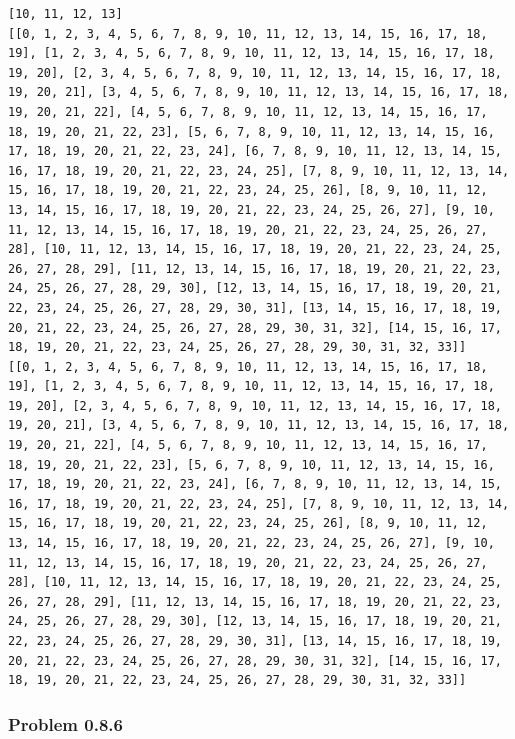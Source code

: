 \documentclass[
  letterpaper,
  DIV=11,
  numbers=noendperiod]{scrartcl}
\begin{document}
\begin{verbatim}
[10, 11, 12, 13]
[[0, 1, 2, 3, 4, 5, 6, 7, 8, 9, 10, 11, 12, 13, 14, 15, 16, 17, 18, 19], [1, 2, 3, 4, 5, 6, 7, 8, 9, 10, 11, 12, 13, 14, 15, 16, 17, 18, 19, 20], [2, 3, 4, 5, 6, 7, 8, 9, 10, 11, 12, 13, 14, 15, 16, 17, 18, 19, 20, 21], [3, 4, 5, 6, 7, 8, 9, 10, 11, 12, 13, 14, 15, 16, 17, 18, 19, 20, 21, 22], [4, 5, 6, 7, 8, 9, 10, 11, 12, 13, 14, 15, 16, 17, 18, 19, 20, 21, 22, 23], [5, 6, 7, 8, 9, 10, 11, 12, 13, 14, 15, 16, 17, 18, 19, 20, 21, 22, 23, 24], [6, 7, 8, 9, 10, 11, 12, 13, 14, 15, 16, 17, 18, 19, 20, 21, 22, 23, 24, 25], [7, 8, 9, 10, 11, 12, 13, 14, 15, 16, 17, 18, 19, 20, 21, 22, 23, 24, 25, 26], [8, 9, 10, 11, 12, 13, 14, 15, 16, 17, 18, 19, 20, 21, 22, 23, 24, 25, 26, 27], [9, 10, 11, 12, 13, 14, 15, 16, 17, 18, 19, 20, 21, 22, 23, 24, 25, 26, 27, 28], [10, 11, 12, 13, 14, 15, 16, 17, 18, 19, 20, 21, 22, 23, 24, 25, 26, 27, 28, 29], [11, 12, 13, 14, 15, 16, 17, 18, 19, 20, 21, 22, 23, 24, 25, 26, 27, 28, 29, 30], [12, 13, 14, 15, 16, 17, 18, 19, 20, 21, 22, 23, 24, 25, 26, 27, 28, 29, 30, 31], [13, 14, 15, 16, 17, 18, 19, 20, 21, 22, 23, 24, 25, 26, 27, 28, 29, 30, 31, 32], [14, 15, 16, 17, 18, 19, 20, 21, 22, 23, 24, 25, 26, 27, 28, 29, 30, 31, 32, 33]]
[[0, 1, 2, 3, 4, 5, 6, 7, 8, 9, 10, 11, 12, 13, 14, 15, 16, 17, 18, 19], [1, 2, 3, 4, 5, 6, 7, 8, 9, 10, 11, 12, 13, 14, 15, 16, 17, 18, 19, 20], [2, 3, 4, 5, 6, 7, 8, 9, 10, 11, 12, 13, 14, 15, 16, 17, 18, 19, 20, 21], [3, 4, 5, 6, 7, 8, 9, 10, 11, 12, 13, 14, 15, 16, 17, 18, 19, 20, 21, 22], [4, 5, 6, 7, 8, 9, 10, 11, 12, 13, 14, 15, 16, 17, 18, 19, 20, 21, 22, 23], [5, 6, 7, 8, 9, 10, 11, 12, 13, 14, 15, 16, 17, 18, 19, 20, 21, 22, 23, 24], [6, 7, 8, 9, 10, 11, 12, 13, 14, 15, 16, 17, 18, 19, 20, 21, 22, 23, 24, 25], [7, 8, 9, 10, 11, 12, 13, 14, 15, 16, 17, 18, 19, 20, 21, 22, 23, 24, 25, 26], [8, 9, 10, 11, 12, 13, 14, 15, 16, 17, 18, 19, 20, 21, 22, 23, 24, 25, 26, 27], [9, 10, 11, 12, 13, 14, 15, 16, 17, 18, 19, 20, 21, 22, 23, 24, 25, 26, 27, 28], [10, 11, 12, 13, 14, 15, 16, 17, 18, 19, 20, 21, 22, 23, 24, 25, 26, 27, 28, 29], [11, 12, 13, 14, 15, 16, 17, 18, 19, 20, 21, 22, 23, 24, 25, 26, 27, 28, 29, 30], [12, 13, 14, 15, 16, 17, 18, 19, 20, 21, 22, 23, 24, 25, 26, 27, 28, 29, 30, 31], [13, 14, 15, 16, 17, 18, 19, 20, 21, 22, 23, 24, 25, 26, 27, 28, 29, 30, 31, 32], [14, 15, 16, 17, 18, 19, 20, 21, 22, 23, 24, 25, 26, 27, 28, 29, 30, 31, 32, 33]]
\end{verbatim}

\hypertarget{problem-0.8.6}{%
\subsubsection{Problem 0.8.6}\label{problem-0.8.6}}
\end{document}
